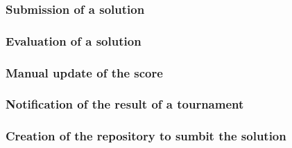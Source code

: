 \subsubsection{Submission of a solution}
\subsubsection{Evaluation of a solution}
\subsubsection{Manual update of the score}
\subsubsection{Notification of the result of a tournament}
\subsubsection{Creation of the repository to sumbit the solution}
